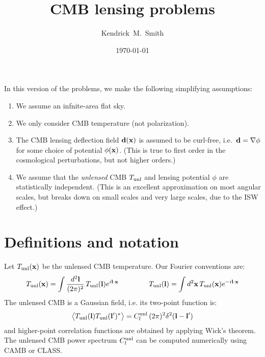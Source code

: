 \documentclass[aps,prd,superscriptaddress,groupedaddress,nofootinbib,nobibnotes]{revtex4}
\newcommand{\be}{\begin{equation}}
\newcommand{\ee}{\end{equation}}
\def\x{{\bf x}}
\def\l{{\bf l}}
\begin{document}
\title{CMB lensing problems}

\author{Kendrick~M.~Smith}

\date{\today}


\maketitle

\par\noindent
In this version of the problems, we make the following simplifying assumptions:
\begin{enumerate}
\item We assume an infnite-area flat sky.
\item We only consider CMB temperature (not polarization).
\item The CMB lensing deflection field ${\bf d}(\x)$ is assumed to be curl-free,
  i.e.~${\bf d} = \nabla \phi$ for some choice of potential
  $\phi(\x)$.  (This is true to first order in the cosmological perturbations,
  but not higher orders.)
\item We assume that the {\em unlensed} CMB $T_{\rm unl}$ and lensing potential $\phi$
  are statistically independent.  (This is an excellent approximation on most angular scales,
  but breaks down on small scales and very large scales, due to the ISW effect.)
\end{enumerate}

\section{Definitions and notation}

Let $T_{\rm unl}(\x)$ be the unlensed CMB temperature.
Our Fourier conventions are:
\be
T_{\rm unl}(\x) = \int \frac{d^2\l}{(2\pi)^2} \, T_{\rm unl}(\l) e^{i\l\cdot\x}
\hspace{1.5cm}
T_{\rm unl}(\l) = \int d^2\x \, T_{\rm unl}(\x) e^{-i\l\cdot\x}  \label{eq:continuous_fourier_conventions}
\ee
The unlensed CMB is a Gaussian field, i.e. its two-point function is:
\be
\big\langle T_{\rm unl}(\l) T_{\rm unl}(\l')^* \big\rangle = C_l^{\rm unl} \, (2\pi)^2 \delta^2(\l-\l')  \label{eq:continuous_cl}
\ee
and higher-point correlation functions are obtained by applying Wick's theorem.
The unlensed CMB power spectrum $C_l^{\rm unl}$ can be computed numerically using
CAMB or CLASS.
\end{document}
